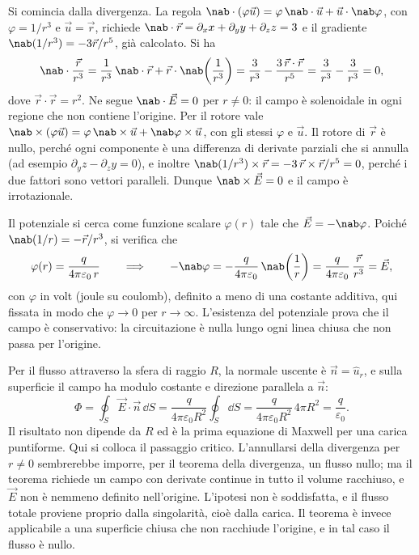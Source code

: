 \documentclass[main.tex]{subfiles}
\begin{document}
Si comincia dalla divergenza. La regola $\nab\cdot(\varphi\vec u)=\varphi\,\nab\cdot\vec u+\vec u\cdot\nab\varphi$, con $\varphi=1/r^3$ e $\vec u=\vec r$, richiede $\nab\cdot\vec r=\partial_xx+\partial_yy+\partial_zz=3$ e il gradiente $\nab(1/r^3)=-3\vec r/r^5$, già calcolato. Si ha
\[
\nab\cdot\frac{\vec r}{r^3}=\frac1{r^3}\,\nab\cdot\vec r+\vec r\cdot\nab\!\left(\frac1{r^3}\right)=\frac3{r^3}-\frac{3\,\vec r\cdot\vec r}{r^5}=\frac3{r^3}-\frac3{r^3}=0 ,
\]
dove $\vec r\cdot\vec r=r^2$. Ne segue $\nab\cdot\vec E=0$ per $r\neq0$: il campo è solenoidale in ogni regione che non contiene l'origine. Per il rotore vale $\nab\times(\varphi\vec u)=\varphi\,\nab\times\vec u+\nab\varphi\times\vec u$, con gli stessi $\varphi$ e $\vec u$. Il rotore di $\vec r$ è nullo, perché ogni componente è una differenza di derivate parziali che si annulla (ad esempio $\partial_yz-\partial_zy=0$), e inoltre $\nab(1/r^3)\times\vec r=-3\,\vec r\times\vec r/r^5=0$, perché i due fattori sono vettori paralleli. Dunque $\nab\times\vec E=0$ e il campo è irrotazionale.

Il potenziale si cerca come funzione scalare $\varphi(r)$ tale che $\vec E=-\nab\varphi$. Poiché $\nab(1/r)=-\vec r/r^3$, si verifica che
\[
\varphi(r)=\frac{q}{4\pi\varepsilon_0\,r}\qquad\Longrightarrow\qquad-\nab\varphi=-\frac{q}{4\pi\varepsilon_0}\,\nab\!\left(\frac1r\right)=\frac{q}{4\pi\varepsilon_0}\,\frac{\vec r}{r^3}=\vec E ,
\]
con $\varphi$ in volt (joule su coulomb), definito a meno di una costante additiva, qui fissata in modo che $\varphi\to0$ per $r\to\infty$. L'esistenza del potenziale prova che il campo è conservativo: la circuitazione è nulla lungo ogni linea chiusa che non passa per l'origine.

Per il flusso attraverso la sfera di raggio $R$, la normale uscente è $\vec n=\hat u_r$, e sulla superficie il campo ha modulo costante e direzione parallela a $\vec n$:
\[
\Phi=\oint_S\vec E\cdot\vec n\,\dd S=\frac{q}{4\pi\varepsilon_0R^2}\oint_S\dd S=\frac{q}{4\pi\varepsilon_0R^2}\,4\pi R^2=\frac{q}{\varepsilon_0}.
\]
Il risultato non dipende da $R$ ed è la prima equazione di Maxwell per una carica puntiforme. Qui si colloca il passaggio critico. L'annullarsi della divergenza per $r\neq0$ sembrerebbe imporre, per il teorema della divergenza, un flusso nullo; ma il teorema richiede un campo con derivate continue in tutto il volume racchiuso, e $\vec E$ non è nemmeno definito nell'origine. L'ipotesi non è soddisfatta, e il flusso totale proviene proprio dalla singolarità, cioè dalla carica. Il teorema è invece applicabile a una superficie chiusa che non racchiude l'origine, e in tal caso il flusso è nullo.
\end{document}
